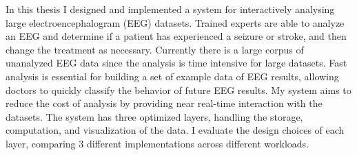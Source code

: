 % 
% 
%

In this thesis I designed and implemented a system for interactively analysing
large electroencephalogram (EEG) datasets. Trained experts are able to analyze
an EEG and determine if a patient has experienced a seizure or stroke, and then
change the treatment as necessary. Currently there is a large corpus of
unanalyzed EEG data since the analysis is time intensive for large datasets.
Fast analysis is essential for building a set of example data of EEG results,
allowing doctors to quickly classify the behavior of future EEG results. My
system aims to reduce the cost of analysis by providing near real-time
interaction with the datasets. The system has three optimized layers, handling
the storage, computation, and visualization of the data. I evaluate the design
choices of each layer, comparing 3 different implementations across different
workloads.
